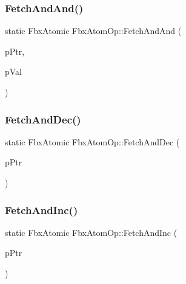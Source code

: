 \mbox{\label{class_fbx_atom_op_a40652f1848358c1337083471805e01b0}} 
\subsubsection{\texorpdfstring{Fetch\+And\+And()}{FetchAndAnd()}}
{\footnotesize\ttfamily static Fbx\+Atomic Fbx\+Atom\+Op\+::\+Fetch\+And\+And (\begin{DoxyParamCaption}\item[{volatile Fbx\+Atomic $\ast$}]{p\+Ptr,  }\item[{Fbx\+Atomic}]{p\+Val }\end{DoxyParamCaption})\hspace{0.3cm}{\ttfamily [static]}}

\mbox{\label{class_fbx_atom_op_a8b0f537c04b2c5be48e4498a4b512e22}} 
\subsubsection{\texorpdfstring{Fetch\+And\+Dec()}{FetchAndDec()}}
{\footnotesize\ttfamily static Fbx\+Atomic Fbx\+Atom\+Op\+::\+Fetch\+And\+Dec (\begin{DoxyParamCaption}\item[{volatile Fbx\+Atomic $\ast$}]{p\+Ptr }\end{DoxyParamCaption})\hspace{0.3cm}{\ttfamily [static]}}

\mbox{\label{class_fbx_atom_op_ac442236600db5268031a9e8045a97753}} 
\subsubsection{\texorpdfstring{Fetch\+And\+Inc()}{FetchAndInc()}}
{\footnotesize\ttfamily static Fbx\+Atomic Fbx\+Atom\+Op\+::\+Fetch\+And\+Inc (\begin{DoxyParamCaption}\item[{volatile Fbx\+Atomic $\ast$}]{p\+Ptr }\end{DoxyParamCaption})\hspace{0.3cm}{\ttfamily [static]}}

